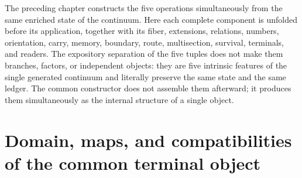 
The preceding chapter constructs the five operations simultaneously from the same enriched state of the continuum. Here each complete component is unfolded before its application, together with its fiber, extensions, relations, numbers, orientation, carry, memory, boundary, route, multisection, survival, terminals, and readers. The expository separation of the five tuples does not make them branches, factors, or independent objects: they are five intrinsic features of the single generated continuum and literally preserve the same state and the same ledger. The common constructor does not assemble them afterward; it produces them simultaneously as the internal structure of a single object.

\section{Domain, maps, and compatibilities of the common terminal object}

